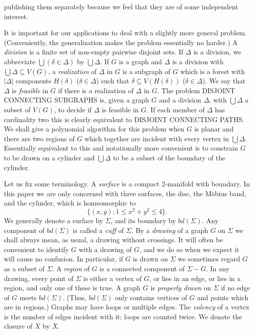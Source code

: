 \noindent publishing them separately because we feel that they are of some independent interest.

It is important for our applications to deal with a slightly more general problem. (Conveniently, the generalization makes the problem essentially no harder.) A \textit{division} is a finite set of non-empty pairwise disjoint sets. If $\Delta$ is a division, we abbreviate $\bigcup (\delta \in \Delta)$ by $\bigcup \Delta$. If $G$ is a graph and $\Delta$ is a division with $\bigcup \Delta \subseteq V(G)$, a \textit{realization} of $\Delta$ in $G$ is a subgraph of $G$ which is a forest with $|\Delta|$ components $H(\delta)$ ($\delta \in \Delta$) such that $\delta \subseteq V(H(\delta))$ ($\delta \in \Delta$). We say that $\Delta$ is \textit{feasible} in $G$ if there is a realization of $\Delta$ in $G$. The problem DISJOINT CONNECTING SUBGRAPHS is, given a graph $G$ and a division $\Delta$, with $\bigcup \Delta$ a subset of $V(G)$, to decide if $\Delta$ is feasible in $G$. If each member of $\Delta$ has cardinality two this is clearly equivalent to DISJOINT CONNECTING PATHS. We shall give a polynomial algorithm for this problem when $G$ is planar and there are two regions of $G$ which together are incident with every vertex in $\bigcup \Delta$. Essentially equivalent to this and notationally more convenient is to constrain $G$ to be drawn on a cylinder and $\bigcup \Delta$ to be a subset of the boundary of the cylinder.

Let us fix some terminology. A \textit{surface} is a compact 2-manifold with boundary. In this paper we are only concerned with three surfaces, the disc, the M\"obius band, and the cylinder, which is homeomorphic to
\begin{equation*}
\{(x, y) : 1 \le x^2 + y^2 \le 4\}.
\end{equation*}
We generally denote a surface by $\Sigma$, and its boundary by $bd(\Sigma)$. Any component of $bd(\Sigma)$ is called a \textit{cuff} of $\Sigma$. By a \textit{drawing} of a graph $G$ on $\Sigma$ we shall always mean, as usual, a drawing without crossings. It will often be convenient to identify $G$ with a drawing of $G$, and we do so when we expect it will cause no confusion. In particular, if $G$ is drawn on $\Sigma$ we sometimes regard $G$ as a subset of $\Sigma$. A \textit{region} of $G$ is a connected component of $\Sigma - G$. In any drawing, every point of $\Sigma$ is either a vertex of $G$, or lies in an edge, or lies in a region, and only one of these is true. A graph $G$ is \textit{properly drawn} on $\Sigma$ if no edge of $G$ meets $bd(\Sigma)$. (Thus, $bd(\Sigma)$ only contains vertices of $G$ and points which are in regions.) Graphs may have loops or multiple edges. The \textit{valency} of a vertex is the number of edges incident with it; loops are counted twice. We denote the closure of $X$ by $\bar{X}$.

